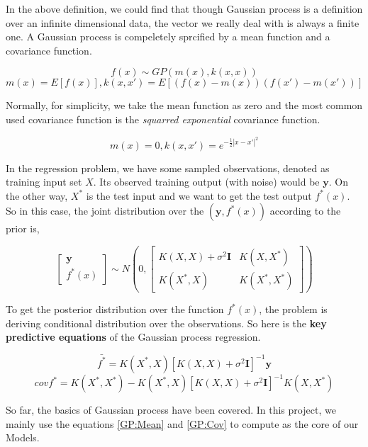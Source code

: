 \documentclass[11pt,twoside,a4paper]{article}
\begin{document}
In the above definition, we could find that though Gaussian process is
a definition over an infinite dimensional data, the vector we really
deal with is always a finite one. A Gaussian process is compeletely
sprcified by a mean function and a covariance function. 
\begin{center}
\begin{equation}
f(x) \sim GP(m(x), k(x, x))
\end{equation}
\begin{equation}
m(x) = E[f(x)], k(x, x') = E[(f(x)-m(x))(f(x')-m(x'))]
\end{equation}
\end{center}
Normally, for simplicity, we take the mean function as zero and the
most common used covariance function is the \textit{squarred
  exponential} covariance function.
\begin{center}
\begin{equation}
m(x) = 0, k(x, x') = e^{-\frac{1}{2}|x-x'|^2}
\end{equation}
\end{center}
In the regression problem, we have some sampled observations, denoted
as training input set $X$. Its observed training output (with noise) would be $\textbf{y}$. On the other
way, $X^*$ is the test input and we want to get the test output
$f^*(x)$. So in this case, the joint distribution over the
$(\textbf{y}, f^*(x))$ according to the prior is,
\begin{center}
\begin{equation}
\begin{bmatrix}
\textbf{y} \\
f^*(x)
\end{bmatrix} \sim N (0,
\begin{bmatrix}
K(X, X) + \sigma^2\textbf{I} & K(X, X^*) \\
K(X^*, X) & K(X^*, X^*)
\end{bmatrix} )
\end{equation}
\end{center}
To get the posterior distribution over the function $f^*(x)$, the
problem is deriving conditional distribution over the observations. So
here is the \textbf{key predictive equations} of the Gaussian process
regression.
\begin{center}
\begin{equation} \label{GP:Mean}
\bar{f^*} = K(X^*, X)[K(X, X) + \sigma^2\textbf{I}]^{-1}\textbf{y}
\end{equation}
\begin{equation} \label{GP:Cov}
cov{f^*} = K(X^*, X^*) - K(X^*, X)[K(X, X) +
\sigma^2\textbf{I}]^{-1}K(X, X^*)
\end{equation}
\end{center}
So far, the basics of Gaussian process have been covered. In this
project, we mainly use the equations \ref{GP:Mean} and \ref{GP:Cov} to
compute as the core of our Models.
\end{document}

